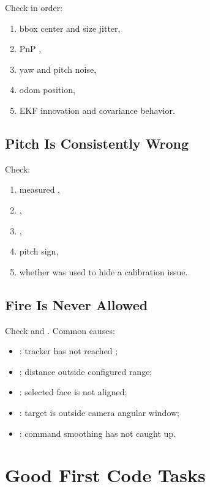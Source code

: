 Check in order:

\begin{enumerate}
  \item bbox center and size jitter,
  \item PnP ,
  \item {} yaw and pitch noise,
  \item odom position,
  \item EKF innovation and covariance behavior.
\end{enumerate}

\subsection{Pitch Is Consistently Wrong}

Check:

\begin{enumerate}
  \item measured ,
  \item {},
  \item {},
  \item pitch sign,
  \item whether  was used to hide a calibration issue.
\end{enumerate}

\subsection{Fire Is Never Allowed}

Check  and . Common causes:

\begin{itemize}
  \item {}: tracker has not reached ;
  \item {}: distance outside configured range;
  \item {}: selected face is not aligned;
  \item {}: target is outside camera angular window;
  \item {}: command smoothing has not caught up.
\end{itemize}

\section{Good First Code Tasks}

